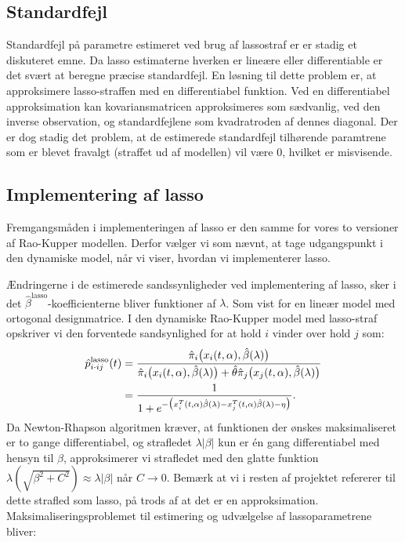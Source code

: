\documentclass[11pt,a4paper]{article}
\begin{document}
\subsection{Standardfejl}
Standardfejl på parametre estimeret ved brug af lassostraf er er stadig et diskuteret emne. Da lasso estimaterne hverken er lineære eller differentiable er det svært at beregne præcise standardfejl. En løsning til dette problem er, at approksimere lasso-straffen med en differentiabel funktion. Ved en differentiabel approksimation kan kovariansmatricen approksimeres som sædvanlig, ved den inverse observation, og standardfejlene som kvadratroden af dennes diagonal. Der er dog stadig det problem, at de estimerede standardfejl tilhørende paramtrene som er blevet fravalgt (straffet ud af modellen) vil være 0, hvilket er misvisende.

\subsection{Implementering af lasso}
Fremgangsmåden i implementeringen af lasso er den samme for vores to versioner af Rao-Kupper modellen. Derfor vælger vi som nævnt, at tage udgangspunkt i den dynamiske model, når vi viser, hvordan vi implementerer lasso. \par
Ændringerne i de estimerede sandssynligheder ved implementering af lasso, sker i det $\hat{\beta}^{\text{lasso}}$-koefficienterne bliver funktioner af $\lambda$. Som vist for en lineær model med ortogonal designmatrice. I den dynamiske Rao-Kupper model med lasso-straf opskriver vi den forventede sandsynlighed for at hold $i$ vinder over hold $j$ som:
\begin{align}
    \hat{p}^{\text{lasso}}_{i\cdot ij}(t)
    &=\frac{\hat{\pi}_i\big{(}x_i(t,\alpha),\hat{\beta}(\lambda)\big{)}}{\hat{\pi}_i\big{(}x_i(t,\alpha),\hat{\beta}(\lambda)\big{)}+\hat{\theta}\hat{\pi}_j\big{(}x_j(t,\alpha),\hat{\beta}(\lambda)\big{)}}\nonumber\\
    &=\frac{1}{1+e^{-\big{(}x_i^T(t,\alpha)\hat{\beta}(\lambda)-x_j^T(t,\alpha)\hat{\beta}(\lambda)-\eta\big{)}}}.
    \label{func:pdynlasso}
\end{align}
Da Newton-Rhapson algoritmen kræver, at funktionen der ønskes maksimaliseret er to gange differentiabel, og strafledet $\lambda |\beta|$ kun er én gang differentiabel med hensyn til $\beta$, approksimerer vi strafledet med den glatte funktion $\lambda(\sqrt{\beta^2+C^2})\approx\lambda |\beta|$ når $C\rightarrow 0$. Bemærk at vi i resten af projektet refererer til dette strafled som lasso, på trods af at det er en approksimation. Maksimaliseringsproblemet til estimering og udvælgelse af lassoparametrene bliver:
\end{document}
